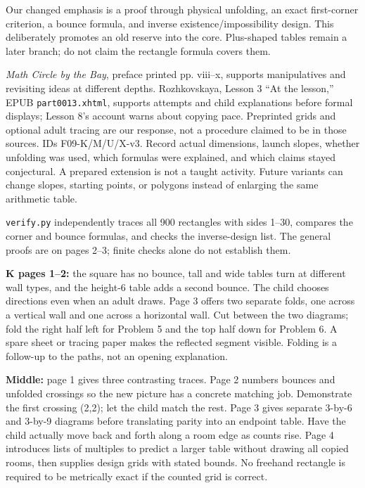 \documentclass[11pt]{article}
\begin{document}
Our changed emphasis is a proof through physical unfolding, an exact first-corner criterion, a bounce formula, and inverse existence/impossibility design. This deliberately promotes an old reserve into the core. Plus-shaped tables remain a later branch; do not claim the rectangle formula covers them.

\emph{Math Circle by the Bay}, preface printed pp. viii--x, supports manipulatives and revisiting ideas at different depths. Rozhkovskaya, Lesson 3 ``At the lesson,'' EPUB \texttt{part0013.xhtml}, supports attempts and child explanations before formal displays; Lesson 8's account warns about copying pace. Preprinted grids and optional adult tracing are our response, not a procedure claimed to be in those sources.
IDs F09-K/M/U/X-v3. Record actual dimensions, launch slopes, whether unfolding was used, which formulas were explained, and which claims stayed conjectural. A prepared extension is not a taught activity. Future variants can change slopes, starting points, or polygons instead of enlarging the same arithmetic table.

\texttt{verify.py} independently traces all 900 rectangles with sides 1--30, compares the corner and bounce formulas, and checks the inverse-design list. The general proofs are on pages 2--3; finite checks alone do not establish them.


\newpage
{}
\textbf{K pages 1--2:} the square has no bounce, tall and wide tables turn at different wall types, and the height-6 table adds a second bounce. The child chooses directions even when an adult draws. Page 3 offers two separate folds, one across a vertical wall and one across a horizontal wall. Cut between the two diagrams; fold the right half left for Problem 5 and the top half down for Problem 6. A spare sheet or tracing paper makes the reflected segment visible. Folding is a follow-up to the paths, not an opening explanation.

\textbf{Middle:} page 1 gives three contrasting traces. Page 2 numbers bounces and unfolded crossings so the new picture has a concrete matching job. Demonstrate the first crossing (2,2); let the child match the rest. Page 3 gives separate 3-by-6 and 3-by-9 diagrams before translating parity into an endpoint table. Have the child actually move back and forth along a room edge as counts rise. Page 4 introduces lists of multiples to predict a larger table without drawing all copied rooms, then supplies design grids with stated bounds. No freehand rectangle is required to be metrically exact if the counted grid is correct.
\end{document}
